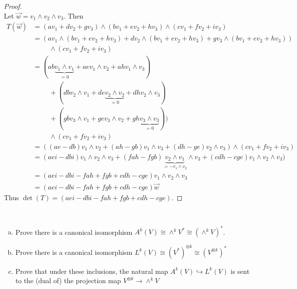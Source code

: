 \documentclass{article}
\newenvironment{problem}[2][Problem]{\begin{trivlist}
\item[\hskip \labelsep {\bfseries #1}\hskip \labelsep {\bfseries #2.}]}{\end{trivlist}}
\begin{document}
\begin{proof} $ $\\
  Let $\vec{w} = v_1 \wedge v_2 \wedge v_3$. Then \begin{align*}
    T(\vec{w}) &= (av_1 + dv_2 + gv_3) \wedge (bv_1 + ev_2 + hv_3) \wedge (cv_1 + fv_2 + iv_3) \\
      &= (av_1 \wedge (bv_1 + ev_2 + hv_3) + dv_2 \wedge (bv_1 + ev_2 + hv_3) + gv_3 \wedge (bv_1 + ev_2 + hv_3)) \\
      &\hspace{1cm}\wedge (cv_1 + fv_2 + iv_3)\\
      &= (ab \underbrace{v_1 \wedge v_1}_{=0} + aev_1 \wedge v_2 + ahv_1 \wedge v_3)\\
      &\hspace{1cm}+ (dbv_2 \wedge v_1 + de\underbrace{v_2 \wedge v_2}_{=0} + dhv_2 \wedge v_3)\\
      &\hspace{1cm}+ (gbv_3 \wedge v_1 + gev_3 \wedge v_2 + gh\underbrace{v_3 \wedge v_3}_{=0})) \\
      &\hspace{1cm}\wedge (cv_1 + fv_2 + iv_3)\\
      &= ((ae-db)v_1 \wedge v_2 + (ah-gb)v_1 \wedge v_3 + (dh-ge)v_2 \wedge v_3)
        \wedge (cv_1 + fv_2 + iv_3) \\
      &= (aei-dbi)v_1 \wedge v_2 \wedge v_3 + (fah-fgb)\underbrace{v_2 \wedge v_1}_{=-v_1\wedge v_2} \wedge v_3 + (cdh-cge)v_1 \wedge v_2 \wedge v_3)\\
      &= (aei - dbi - fah + fgb + cdh - cge) v_1 \wedge v_2 \wedge v_3\\
      &= (aei - dbi - fah + fgb + cdh - cge) \vec{w}
  \end{align*}
  Thus $\det(T) = (aei - dbi - fah + fgb + cdh - cge)$.
\end{proof}

\pagebreak

\begin{problem}{3}\text{} \\
  \begin{enumerate}[(a)]
    \item Prove there is a canonical isomorphism $A^k(V) \cong \wedge^kV^* \cong (\wedge^kV)^*$.
    \item Prove there is a canonical isomorphism $L^k(V) \cong (V^*)^{\otimes k} \cong (V^{\otimes k})^*$
    \item Prove that under these inclusions, the natural map $A^k(V) \hookrightarrow L^k(V)$ is
      sent to the (dual of) the projection map $V^{\otimes k} \rightarrow \wedge^kV$
  \end{enumerate}
\end{problem}
\end{document}
